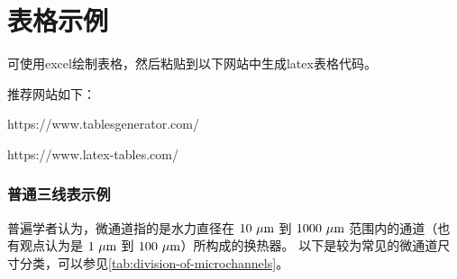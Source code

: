 \chapter{表格示例}\label{ch:2}

可使用excel绘制表格，然后粘贴到以下网站中生成latex表格代码。

推荐网站如下：

https://www.tablesgenerator.com/

https://www.latex-tables.com/

\subsection{普通三线表示例}
普遍学者认为，微通道指的是水力直径在 $10\ \rm{\mu m}$ 到 $1000\ \rm{\mu m}$ 范围内的通道（也有观点认为是 $1\ \rm{\mu m}$ 到 $100\ \rm{\mu m}$）所构成的换热器。
以下是较为常见的微通道尺寸分类，可以参见\cref{tab:division-of-microchannels}。
\begin{table}[htbp]
    \caption[微通道的划分]{微通道的划分\cite{LuSiHong_2021}}
    \label{tab:division-of-microchannels}
\end{table}



